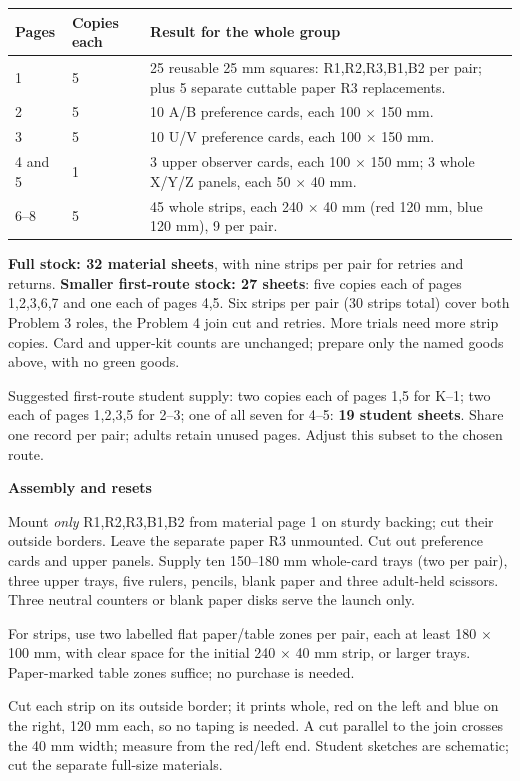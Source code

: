 \documentclass[11pt]{article}
\newcommand{\subhead}[1]{\par\vspace{1mm}\textbf{#1}\par}
\begin{document}
\begin{tabularx}{\linewidth}{@{}L{20mm}L{22mm}X@{}}\toprule
Pages & Copies each & Result for the whole group\\ & 5 & 25 reusable 25 mm squares: R1,R2,R3,B1,B2 per pair; plus 5 separate cuttable paper R3 replacements.\\
2 & 5 & 10 A/B preference cards, each 100 $\times$ 150 mm.\\
3 & 5 & 10 U/V preference cards, each 100 $\times$ 150 mm.\\
4 and 5 & 1 & 3 upper observer cards, each 100 $\times$ 150 mm; 3 whole X/Y/Z panels, each 50 $\times$ 40 mm.\\
6--8 & 5 & 45 whole strips, each 240 $\times$ 40 mm (red 120 mm, blue 120 mm), 9 per pair.\\\bottomrule
\end{tabularx}

\textbf{Full stock: 32 material sheets}, with nine strips per pair for retries and returns. \textbf{Smaller first-route stock: 27 sheets}: five copies each of pages 1,2,3,6,7 and one each of pages 4,5. Six strips per pair (30 strips total) cover both Problem 3 roles, the Problem 4 join cut and retries. More trials need more strip copies. Card and upper-kit counts are unchanged; prepare only the named goods above, with no green goods.

Suggested first-route student supply: two copies each of pages 1,5 for K--1; two each of pages 1,2,3,5 for 2--3; one of all seven for 4--5: \textbf{19 student sheets}. Share one record per pair; adults retain unused pages. Adjust this subset to the chosen route.

\subhead{Assembly and resets}
Mount \emph{only} R1,R2,R3,B1,B2 from material page 1 on sturdy backing; cut their outside borders. Leave the separate paper R3 unmounted. Cut out preference cards and upper panels. Supply ten 150--180 mm whole-card trays (two per pair), three upper trays, five rulers, pencils, blank paper and three adult-held scissors. Three neutral counters or blank paper disks serve the launch only.

For strips, use two labelled flat paper/table zones per pair, each at least 180 $\times$ 100 mm, with clear space for the initial 240 $\times$ 40 mm strip, or larger trays. Paper-marked table zones suffice; no purchase is needed.

Cut each strip on its outside border; it prints whole, red on the left and blue on the right, 120 mm each, so no taping is needed. A cut parallel to the join crosses the 40 mm width; measure from the red/left end. Student sketches are schematic; cut the separate full-size materials.
\end{document}
